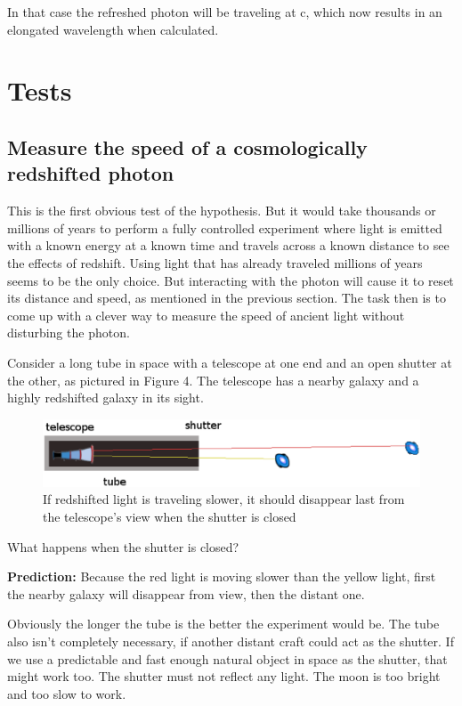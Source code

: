 \documentclass{ws-mpla}
\begin{document}
In that case the refreshed photon will be traveling at c, which now results in an elongated wavelength when calculated.

\section{Tests}

\subsection{Measure the speed of a cosmologically redshifted photon}

This is the first obvious test of the hypothesis. But it would take thousands or millions of years to perform a fully controlled experiment where light is emitted with a known energy at a known time and travels across a known distance to see the effects of redshift.
Using light that has already traveled millions of years seems to be the only choice. But interacting with the photon will cause it to reset its distance and speed, as mentioned in the previous section. The task then is to come up with a clever way to measure the speed of ancient light without disturbing the photon. 

Consider a long tube in space with a telescope at one end and an open shutter at the other, as pictured in Figure 4. 
The telescope has a nearby galaxy and a highly redshifted galaxy in its sight. 

\begin{figure}[h]
\centerline{\includegraphics[width=5.0in]{experiment1.eps}}
\vspace*{8pt}
\caption{If redshifted light is traveling slower, it should disappear last from the telescope's view when the shutter is closed}
\label{fig:experiement}
\end{figure}

What happens when the shutter is closed?

\textbf{Prediction: }Because the red light is moving slower than the yellow light, first the nearby galaxy will disappear from view, then the distant one.

Obviously the longer the tube is the better the experiment would be. The tube also isn't completely necessary, if another distant craft could act as the shutter.
 If we use a predictable and fast enough natural object in space as the shutter, that might work too. The shutter must not reflect any light. 
 The moon is too bright and too slow to work.
\end{document}
